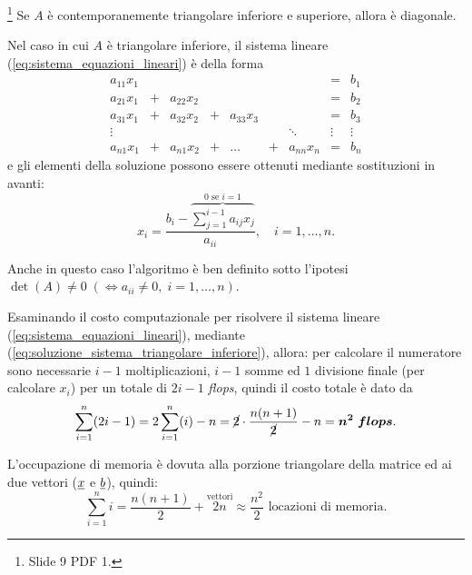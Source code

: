 \begin{remark}\footnote{Slide 9 PDF 1.}
    Se $A$ è contemporanemente triangolare inferiore e superiore, allora è diagonale.
\end{remark}

Nel caso in cui $A$ è triangolare inferiore, il sistema lineare (\ref{eq:sistema_equazioni_lineari}) è della forma
\begin{equation*}
    \begin{matrix}
        a_{11} x_1 && && && &=& b_1\\
        a_{21} x_1 &+& a_{22} x_2 && && &=& b_2\\
        a_{31} x_1  &+& a_{32} x_2 &+& a_{33} x_3 && &=& b_3\\
        \vdots && && &&\ddots &\vdots &\vdots\\
        a_{n1} x_1 &+& a_{n1} x_2 &+& \hdots &+& a_{nn} x_n &=& b_n
    \end{matrix}
\end{equation*}
e gli elementi della soluzione possono essere ottenuti mediante sostituzioni in avanti:
\begin{equation}\label{eq:soluzione_sistema_triangolare_inferiore}
    x_i=\frac{b_i-\overbrace{\sum_{j=1}^{i-1}a_{ij}x_j}^{\text{0 se $i=1$}}}{a_{ii}},\quad i=1,\hdots,n.
\end{equation}

Anche in questo caso l'algoritmo è ben definito sotto l'ipotesi $\det(A)\neq 0\; (\iff a_{ii}\neq 0,\; i=1,\hdots, n)$.

Esaminando il costo computazionale per risolvere il sistema lineare (\ref{eq:sistema_equazioni_lineari}), mediante (\ref{eq:soluzione_sistema_triangolare_inferiore}), allora: per calcolare il numeratore sono necessarie $i-1$ moltiplicazioni, $i-1$ somme ed $1$ divisione finale (per calcolare $x_i$) per un totale di $2i-1$ \textit{flops}, quindi il costo totale è dato da \begin{equation*}
    \sum_{i=1}^n(2i-1)=2\sum_{i=1}^n (i)-n= \cancel{2}\cdot\frac{n(n+1)}{\cancel{2}}-n=\boldsymbol{n^2\; flops}.
\end{equation*}

L'occupazione di memoria è dovuta alla porzione triangolare della matrice ed ai due vettori ($\uline x$ e $\uline b$), quindi:
\begin{equation*}
    \sum_{i=1}^n i = \frac{n(n+1)}{2}+ \overset{\text{vettori}}{2n}\approx \frac{n^2}{2}\text{ locazioni di memoria.}
\end{equation*}

